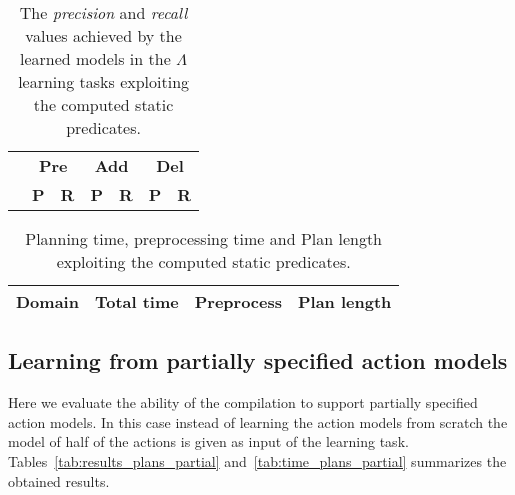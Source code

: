 \documentclass[letterpaper]{article} %
\begin{document}
\begin{table}[hbt!]
\begin{small}
	\begin{center}
		\begin{tabular}{l|l|l|l|l|l|l|}
			 & \multicolumn{2}{|c|}{\bf Pre} & \multicolumn{2}{|c|}{\bf Add} & \multicolumn{2}{|c|}{\bf Del}  \\ \cline{2-7}			 
			  & \multicolumn{1}{|c|}{\bf P} & \multicolumn{1}{|c|}{\bf R} & \multicolumn{1}{|c|}{\bf P} & \multicolumn{1}{|c|}{\bf R} & \multicolumn{1}{|c|}{\bf P} & \multicolumn{1}{|c|}{\bf R} \\
			\hline 
		\end{tabular}
	\end{center}
	\end{small}
\caption{\small The {\em precision} and {\em recall} values achieved by the learned models in the $\Lambda$ learning tasks exploiting the computed static predicates.}
\label{tab:results_plans_static}
\end{table}


\begin{table}[hbt!]
\begin{small}
	\begin{center}
		\begin{tabular}{l|c|c|c|}			 
			Domain & Total time & Preprocess & Plan length  \\
			\hline 			
		\end{tabular}
	\end{center}
        \end{small}
	\caption{\small Planning time, preprocessing time and Plan length exploiting the computed static predicates.}
	\label{tab:time_plans_static}	
\end{table}

\subsection{Learning from partially specified action models}

Here we evaluate the ability of the compilation to support partially specified action models. In this case instead of learning the action models from scratch the model of half of the actions is given as input of the learning task. Tables~\ref{tab:results_plans_partial} and~\ref{tab:time_plans_partial} summarizes the obtained results.	
\end{document}
